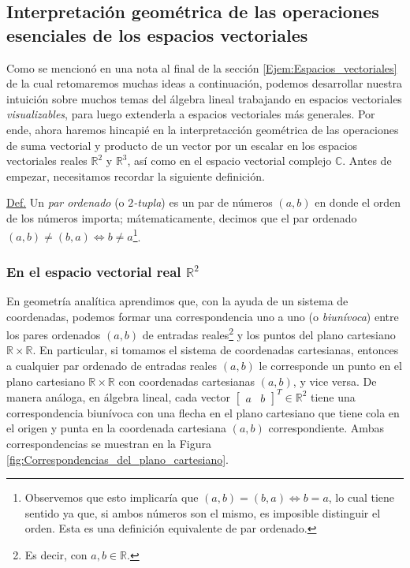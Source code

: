 \documentclass[12pt]{article}
\begin{document}
\subsection{Interpretación geométrica de las operaciones esenciales de los espacios vectoriales} \label{Subsec:Interpretación_geométrica_de_las_operaciones_de_los_espacios_vectoriales}

Como se mencionó en una nota al final de la sección \ref{Ejem:Espacios_vectoriales} \hspace{1.5mm}\textemdash de la cual retomaremos muchas ideas a continuación\textemdash, podemos desarrollar nuestra intuición sobre muchos temas del álgebra lineal trabajando en espacios vectoriales \emph{visualizables}, para luego extenderla a espacios vectoriales más generales. Por ende, ahora haremos hincapié en la interpretacción geométrica de las operaciones de suma vectorial y producto de un vector por un escalar en los espacios vectoriales reales $\mathbb{R}^2$ y $\mathbb{R}^3$, así como en el espacio vectorial complejo $\mathbb{C}$. Antes de empezar, necesitamos recordar la siguiente definición.

\vspace{1.5mm}

\begin{tcolorbox}
 \underline{Def.} Un \emph{par ordenado} (o \emph{$2$-tupla}) es un par de números $(a,b)$ en donde el orden de los números importa; mátematicamente, decimos que el par ordenado $(a,b)\neq (b,a)\iff b\neq a$\footnote{Observemos que esto implicaría que $(a,b)=(b,a)\iff b=a$, lo cual tiene sentido ya que, si ambos números son el mismo, es imposible distinguir el orden. Esta es una definición equivalente de par ordenado.}.
\end{tcolorbox}{}

\subsubsection{En el espacio vectorial real \texorpdfstring{$\mathbb{R}^2$}{TEXT}} \label{Ejem:En_R^2}

En geometría analítica aprendimos que, con la ayuda de un sistema de coordenadas, podemos formar una correspondencia uno a uno (o \emph{biunívoca}) entre los pares ordenados $(a,b)$ de entradas reales\footnote{Es decir, con $a,b\in\mathbb{R}$.} y los puntos del plano cartesiano $\mathbb{R}\times\mathbb{R}$. En particular, si tomamos el sistema de coordenadas cartesianas, entonces a cualquier par ordenado de entradas reales $(a,b)$ le corresponde un punto en el plano cartesiano $\mathbb{R}\times\mathbb{R}$ con coordenadas cartesianas $(a,b)$, y vice versa. De manera análoga, en álgebra lineal, cada vector $\begin{bmatrix}a&b\end{bmatrix}^T \in \mathbb{R}^2$ tiene una correspondencia biunívoca con una flecha en el plano cartesiano que tiene cola en el origen y punta en la coordenada cartesiana $(a,b)$ correspondiente. Ambas correspondencias se muestran en la Figura \ref{fig:Correspondencias_del_plano_cartesiano}.
\end{document}
